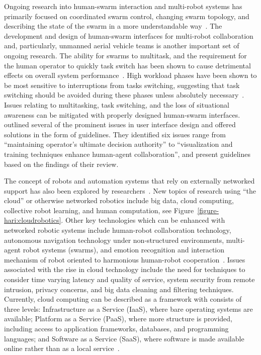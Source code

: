 Ongoing research into human-swarm interaction and multi-robot systems has primarily focused on coordinated swarm control, changing swarm topology, and describing the state of the swarm in a more understandable way~\citep{wang_current_2018}.
The development and design of human-swarm interfaces for multi-robot collaboration and, particularly, unmanned aerial vehicle teams is another important set of ongoing research.
The ability for swarms to multitask, and the requirement for the human operator to quickly task switch has been shown to cause detrimental effects on overall system performance~\citep{chen_humanagent_2014}.
High workload phases have been shown to be most sensitive to interruptions from tasks switching, suggesting that task switching should be avoided during these phases unless absolutely necessary~\citep{norman_user_1986}.
Issues relating to multitasking, task switching, and the loss of situational awareness can be mitigated with properly designed human-swarm interfaces.
\citeauthor{chen_humanagent_2014} outlined several of the prominent issues in user interface design and offered solutions in the form of guidelines.
They identified six issues range from ``maintaining operator's ultimate decision authority'' to ``visualization and training techniques enhance human-agent collaboration'', and present guidelines based on the findings of their review.

The concept of robots and automation systems that rely on externally networked support has also been explored by researchers~\citep{kehoe_survey_2015}.
New topics of research using ``the cloud'' or otherwise networked robotics include big data, cloud computing, collective robot learning, and human computation, see Figure~\ref{figure-hari:cloudrobotics}.
Other key technologies which can be enhanced with networked robotic systems include human-robot collaboration technology, autonomous navigation technology under non-structured environments, multi-agent robot systems (swarms), and emotion recognition and interaction mechanism of robot oriented to harmonious human-robot cooperation~\citep{wang_current_2018}.
Issues associated with the rise in cloud technology include the need for techniques to consider time varying latency and quality of service, system security from remote intrusion, privacy concerns, and big data cleaning and filtering techniques.
Currently, cloud computing can be described as a framework with consists of three levels: Infrastructure as a Service (IaaS), where bare operating systems are available; Platform as a Service (PaaS), where more structure is provided, including access to application frameworks, databases, and programming languages; and Software as a Service (SaaS), where software is made available online rather than as a local service~\citep{kehoe_survey_2015}.

